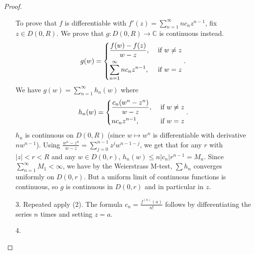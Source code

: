 \begin{proof}
\begin{enumerate}
        To prove that \(f\) is differentiable with \(f'(z)=\sum\limits_{n=1}^{\infty} nc_n z^{n-1}\), fix \(z \in D(0,R)\). We prove that \(g: D(0,R) \to \mathbb{C}\) is continuous instead.
        \[
            g(w) = \begin{dcases}
                \frac{f(w) - f(z)}{w - z}, &\text{ if } w\neq  z\\
                \sum\limits_{n=1}^{\infty} nc_n z^{n-1}, &\text{ if } w = z
            \end{dcases}.
        \]
        We have \(g(w) = \sum\limits_{n=1}^{\infty} h_n(w)\) where
        \[
            h_n(w) = \begin{dcases}
                \frac{c_n(w^n - z^n)}{w - z}, &\text{ if } w\neq z\\
                nc_n z^{n-1}, &\text{ if } w = z\\
            \end{dcases}.
        \]
        \(h_n\) is continuous on \(D(0,R)\) (since \(w \mapsto w^n\) is differentiable with derivative \(nw^{n-1}\)). Using \(\frac{w^n - z^n}{w-z}=\sum\limits_{j=0}^{n-1}z^j w^{n-1-j}\), we get that for any \(r\) with \(\left\vert z \right\vert < r<R\) and any \(w \in D(0,r)\), \(h_n(w) \leq n\left\vert c_n \right\vert r^{n-1} = M_n\). Since \(\sum\limits_{n=1}^{\infty} M_1<\infty\), we have by the Weierstrass M-test, \(\sum h_n\) converges uniformly on \(D(0,r)\). But a uniform limit of continuous functions is continuous, so \(g\) is continuous in \(D(0,r)\) and in particular in \(z\).
        \item[3.] Repeated apply (2). The formula \(c_n = \frac{f^(n)(a)}{n!}\) follows by differentiating the series \(n\) times and setting \(z = a\).
        \item[4.]
    \end{enumerate}
\end{proof}